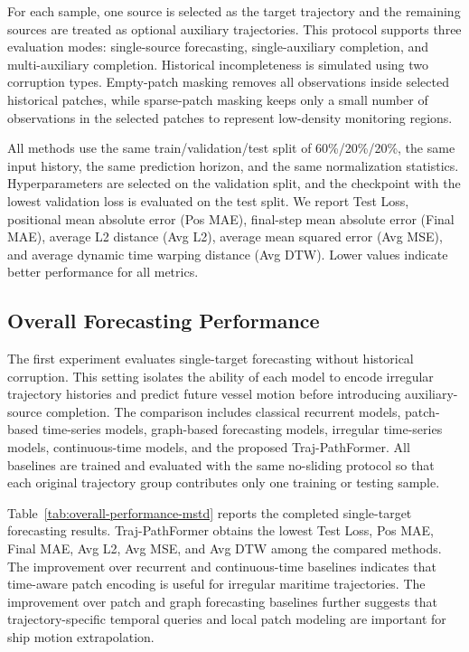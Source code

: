 For each sample, one source is selected as the target trajectory and the remaining sources are treated as optional auxiliary trajectories. This protocol supports three evaluation modes: single-source forecasting, single-auxiliary completion, and multi-auxiliary completion. Historical incompleteness is simulated using two corruption types. Empty-patch masking removes all observations inside selected historical patches, while sparse-patch masking keeps only a small number of observations in the selected patches to represent low-density monitoring regions.

All methods use the same train/validation/test split of 60\%/20\%/20\%, the same input history, the same prediction horizon, and the same normalization statistics. Hyperparameters are selected on the validation split, and the checkpoint with the lowest validation loss is evaluated on the test split. We report Test Loss, positional mean absolute error (Pos MAE), final-step mean absolute error (Final MAE), average L2 distance (Avg L2), average mean squared error (Avg MSE), and average dynamic time warping distance (Avg DTW). Lower values indicate better performance for all metrics.

\subsection{Overall Forecasting Performance}
\label{subsec:overall-performance}

The first experiment evaluates single-target forecasting without historical corruption. This setting isolates the ability of each model to encode irregular trajectory histories and predict future vessel motion before introducing auxiliary-source completion. The comparison includes classical recurrent models, patch-based time-series models, graph-based forecasting models, irregular time-series models, continuous-time models, and the proposed Traj-PathFormer. All baselines are trained and evaluated with the same no-sliding protocol so that each original trajectory group contributes only one training or testing sample.

Table~\ref{tab:overall-performance-mstd} reports the completed single-target forecasting results. Traj-PathFormer obtains the lowest Test Loss, Pos MAE, Final MAE, Avg L2, Avg MSE, and Avg DTW among the compared methods. The improvement over recurrent and continuous-time baselines indicates that time-aware patch encoding is useful for irregular maritime trajectories. The improvement over patch and graph forecasting baselines further suggests that trajectory-specific temporal queries and local patch modeling are important for ship motion extrapolation.

